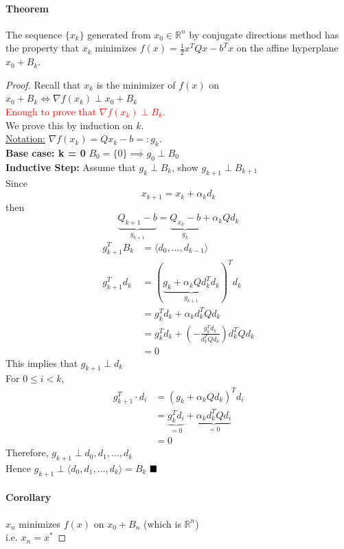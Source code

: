\documentclass[11pt]{article}
\newcommand{\tb}[1]{\textbf{#1}}
\newcommand{\real}[0]{\mathbb{R}}
\newcommand{\under}[1]{\underline{#1}}
\newcommand{\qed}[0]{$\hfill\blacksquare$}
\begin{document}
\paragraph{Theorem}
The sequence $\{x_k\}$ generated from $x_0 \in \real^n$ by conjugate directions method has the property that $x_k$ minimizes $f(x) = \frac{1}{2}x^TQx - b^Tx$ on the affine hyperplane $x_0 + B_k$. \\
\begin{proof}
	Recall that $x_k$ is the minimizer of $f(x)$ on $x_0 + B_k \iff \nabla f(x_k) \perp x_0 + B_k$ \\
	\textcolor{red}{Enough to prove that $\nabla f(x_k) \perp B_k$.} \\
	We prove this by induction on $k$. \\
	\under{Notation:} $\nabla f(x_k) = Q x_k - b =: g_k$. \\
	\tb{Base case: k = 0} $B_0 = \{0\} \implies g_0 \perp B_0$ \\
	\tb{Inductive Step: } Assume that $g_k \perp B_k$, show $g_{k+1} \perp B_{k+1}$ \\
	Since $$x_{k+1} = x_k + \alpha_k d_k$$
	then $$\underbrace{Q_{k+1} - b}_{g_{k+1}} = \underbrace{Q_{x_k} - b}_{g_k} + \alpha_k Q d_k$$
\begin{align}
	g_{k+1}^TB_k &= \langle d_0, \hdots, d_{k-1} \rangle \\
	g_{k+1}^Td_k &= (\underbrace{g_k + \alpha_k Q d_k^T d_k}_{g_{k+1}})^Td_k \\
	&= g_k^Td_k + \alpha_k d_k^T Q d_k \\
	&= g_k^Td_k + (- \frac{g_k^Td_k}{d_k^TQd_k})d_k^TQd_k \\
	&= 0
\end{align}
This implies that $g_{k+1} \perp d_k$ \\
For $0 \leq i < k$, 
\begin{align}
g_{k+1}^T\cdot d_i &= (g_k + \alpha_k Q d_k)^T d_i \\
&= \underbrace{g_k^Td_i}_{= 0} + \underbrace{\alpha_k d_k^T Q d_i}_{= 0} \\
&= 0	
\end{align}
Therefore, $g_{k+1} \perp d_0, d_1, \hdots, d_k$\\
Hence $g_{k+1} \perp \langle d_0, d_1, \hdots, d_k \rangle = B_k$
\qed 

\paragraph{Corollary} $x_n$ minimizes $f(x)$ on $x_0 + B_n$ (which is $\real^n$) \\
i.e. $x_n = x^*$ 

\end{proof}
\end{document}
